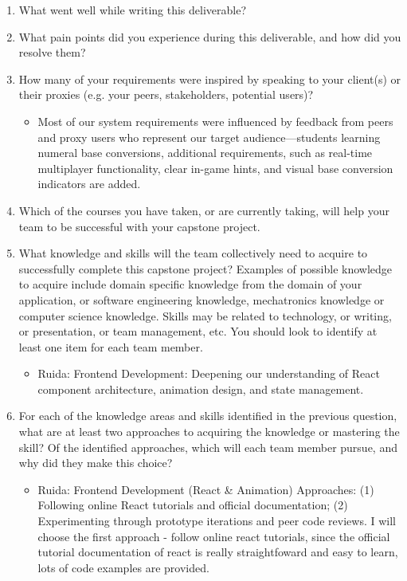 \begin{enumerate}
  \item What went well while writing this deliverable? 
  \item What pain points did you experience during this deliverable, and how did
  you resolve them?
  \item How many of your requirements were inspired by speaking to your
  client(s) or their proxies (e.g. your peers, stakeholders, potential users)?
\begin{itemize}
\item Most of our system requirements were influenced by feedback from peers and proxy users who represent our target audience—students learning numeral base conversions, additional requirements, such as real-time multiplayer functionality, clear in-game hints, and visual base conversion indicators are added.
\end{itemize}
  \item Which of the courses you have taken, or are currently taking, will help
  your team to be successful with your capstone project.
  \item What knowledge and skills will the team collectively need to acquire to
  successfully complete this capstone project?  Examples of possible knowledge
  to acquire include domain specific knowledge from the domain of your
  application, or software engineering knowledge, mechatronics knowledge or
  computer science knowledge.  Skills may be related to technology, or writing,
  or presentation, or team management, etc.  You should look to identify at
  least one item for each team member.
\begin{itemize}

\item Ruida: Frontend Development: Deepening our understanding of React component architecture, animation design, and state management.
\end{itemize}
  \item For each of the knowledge areas and skills identified in the previous
  question, what are at least two approaches to acquiring the knowledge or
  mastering the skill?  Of the identified approaches, which will each team
  member pursue, and why did they make this choice?
	\begin{itemize}
	\item Ruida: Frontend Development (React \& Animation)
	Approaches: (1) Following online React tutorials and official documentation; (2) Experimenting through prototype 	iterations and peer code reviews. I will choose the first approach - follow online react tutorials,  since the official tutorial documentation of react is really straightfoward and easy to learn, lots of code examples are provided.
	\end{itemize}
\end{enumerate}

